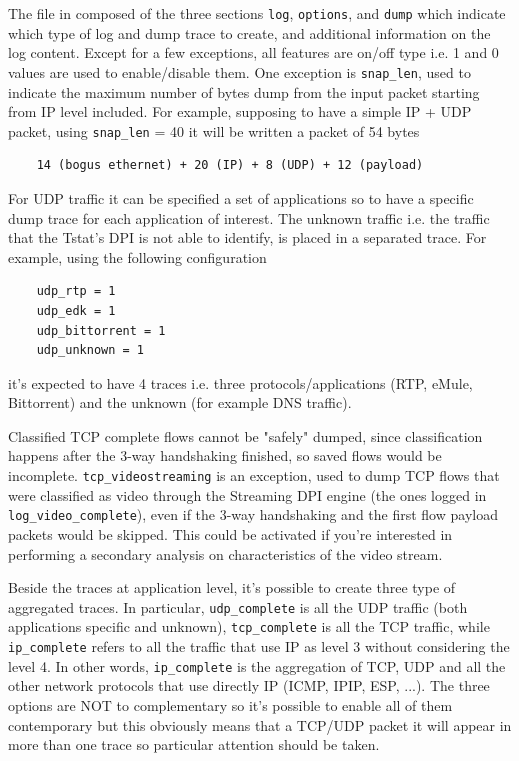 \documentclass[11pt]{article}
\begin{document}
The file in composed of the three sections \texttt{log}, \texttt{options}, and \texttt{dump} which indicate which
type of log and dump trace to create, and additional information on the log content.
Except for a few exceptions, all features are on/off type i.e. 1 and 0 values are used to 
enable/disable them. One exception is \texttt{snap\_len}, used to indicate the maximum number of bytes
dump from the input packet starting from IP level included. For example, supposing
to have a simple IP + UDP packet, using \texttt{snap\_len} = 40 it will be written a
packet of 54 bytes

\begin{small}\begin{verbatim}
    14 (bogus ethernet) + 20 (IP) + 8 (UDP) + 12 (payload)
\end{verbatim}\end{small} \noindent
For UDP traffic it can be specified a set of applications so to have a specific
dump trace for each application of interest. The unknown traffic i.e. the traffic
that the Tstat's DPI is not able to identify, is placed in a separated trace.
For example, using the following configuration

\begin{small}\begin{verbatim}
    udp_rtp = 1
    udp_edk = 1
    udp_bittorrent = 1
    udp_unknown = 1
\end{verbatim}\end{small} \noindent
it's expected to have 4 traces i.e. three protocols/applications (RTP, eMule, Bittorrent)
and the unknown (for example DNS traffic).



Classified TCP complete flows cannot be "safely" dumped, since classification
happens after the 3-way handshaking finished, so saved flows would be
incomplete. 
\texttt{tcp\_videostreaming} is an exception, used to dump TCP flows that were classified
as video through the Streaming DPI engine (the ones logged in
\texttt{log\_video\_complete}), even if the 3-way handshaking and the first flow payload
packets would be skipped. This could be activated if you're interested in performing
a secondary analysis on characteristics of the video stream.



Beside the traces at application level, it's possible to create three type of aggregated
traces. In particular, \texttt{udp\_complete} is all the UDP traffic (both applications specific and unknown),
\texttt{tcp\_complete} is all the TCP traffic, while
\texttt{ip\_complete} refers to all the traffic that use IP as level 3 without considering the level 4. 
In other words, \texttt{ip\_complete} is the aggregation of TCP, UDP and all the other network protocols that use directly IP
(ICMP, IPIP, ESP, ...). The three options are NOT to complementary so
it's possible to enable all of them contemporary but this obviously means that a TCP/UDP packet
it will appear in more than one trace so particular attention should be taken.
\end{document}
